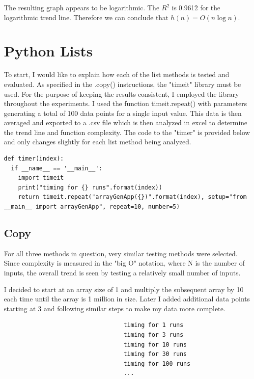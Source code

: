 \documentclass[12pt]{article}
\begin{document}
\noindent The resulting graph appears to be logarithmic. The $R^2$ is 0.9612 for the logarithmic trend line. Therefore we can conclude that $h(n) = O(n\log{n})$.

\section{Python Lists}

To start, I would like to explain how each of the list methods is tested and evaluated. As specified in the .copy() instructions, the "timeit" library must be used. For the purpose of keeping the results consistent, I employed the library throughout the experiments. I used the function timeit.repeat() with parameters generating a total of 100 data points for a single input value. This data is then averaged and exported to a .csv file which is then analyzed in excel to determine the trend line and function complexity. The code to the "timer" is provided below and only changes slightly for each list method being analyzed.
\scriptsize
\begin{verbatim}
def timer(index):
  if __name__ == '__main__':
    import timeit
    print("timing for {} runs".format(index))
    return timeit.repeat("arrayGenApp({})".format(index), setup="from __main__ import arrayGenApp", repeat=10, number=5)
\end{verbatim}
\normalsize

\subsection{Copy}
For all three methods in question, very similar testing methods were selected. Since complexity is measured in the "big O" notation, where N is the number of inputs, the overall trend is seen by testing a relatively small number of inputs. 

I decided to start at an array size of 1 and multiply the subsequent array by 10 each time until the array is 1 million in size. Later I  added additional data points starting at 3 and following similar steps to make my data more complete. 

\footnotesize
\begin{verbatim}
                                  timing for 1 runs
                                  timing for 3 runs
                                  timing for 10 runs
                                  timing for 30 runs
                                  timing for 100 runs
                                  ...
\end{verbatim}
\normalsize
  
\end{document}
